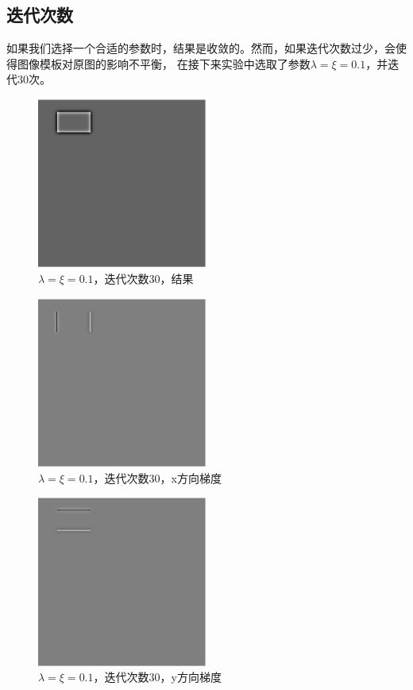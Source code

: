 \subsection{迭代次数}
如果我们选择一个合适的参数时，结果是收敛的。然而，如果迭代次数过少，会使得图像模板对原图的影响不平衡，
在接下来实验中选取了参数$\lambda=\xi=0.1$，并迭代30次。
\begin{figure}[h!]
\center
\includegraphics[width=0.5\textwidth]{figure/gradtest/Iout2}
\caption{$\lambda=\xi=0.1$，迭代次数30，结果}\label{fig:Iout2}
\end{figure}
\begin{figure}[h!]
\center
\includegraphics[width=0.5\textwidth]{figure/gradtest/Ioutx2}
\caption{$\lambda=\xi=0.1$，迭代次数30，x方向梯度}\label{fig:Ioutx2}
\end{figure}
\begin{figure}[h!]
\center
\includegraphics[width=0.5\textwidth]{figure/gradtest/Iouty2}
\caption{$\lambda=\xi=0.1$，迭代次数30，y方向梯度}\label{fig:Iouty2}
\end{figure}
